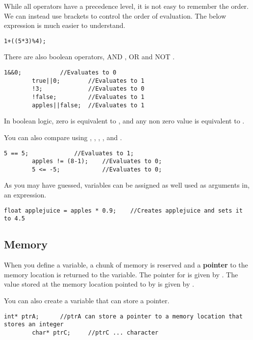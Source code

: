\documentclass{article}
\begin{document}
		While all operators have a precedence level, it is not easy to remember the order. We can instead use brackets to control the order of evaluation. The below expression is much easier to understand.

		\begin{lstlisting}[gobble=8]
		1+((5*3)%4);
		\end{lstlisting}

		There are also boolean operators, AND \inlncd{\&\&}, OR \inlncd{||} and NOT \inlncd{!}.

		\begin{lstlisting}[gobble=8]
		1&&0;			//Evaluates to 0
		true||0;		//Evaluates to 1
		!3;				//Evaluates to 0
		!false;			//Evaluates to 1
		apples||false;	//Evaluates to 1
		\end{lstlisting}

		In boolean logic, zero is equivalent to , and any non zero value is equivalent to .

		You can also compare using \inlncd{==}, \inlncd{!=}, \inlncd{>}, \inlncd{>=}, \inlncd{<} and \inlncd{<=}.

		\begin{lstlisting}[gobble=8]
		5 == 5;				//Evaluates to 1;
		apples != (8-1);	//Evaluates to 0;
		5 <= -5;			//Evaluates to 0;
		\end{lstlisting}


		As you may have guessed, variables can be assigned as well used as arguments in, an expression.

		\begin{lstlisting}[gobble=8]
		float applejuice = apples * 0.9;	//Creates applejuice and sets it to 4.5
		\end{lstlisting}

	\subsection{Memory}


		When you define a variable, a chunk of memory is reserved and a \textbf{pointer} to the memory location is returned to the variable. The pointer for  is given by . The value stored at the memory location pointed to by  is given by .

		You can also create a variable that can store a pointer.

		\begin{lstlisting}[gobble=8]
		int* ptrA;		//ptrA can store a pointer to a memory location that stores an integer
		char* ptrC;		//ptrC ... character
		\end{lstlisting}
\end{document}
